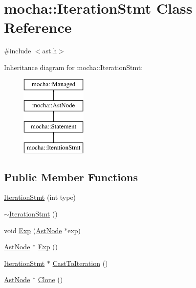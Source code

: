 \hypertarget{classmocha_1_1_iteration_stmt}{
\section{mocha::IterationStmt Class Reference}
\label{classmocha_1_1_iteration_stmt}
}


{\ttfamily \#include $<$ast.h$>$}

Inheritance diagram for mocha::IterationStmt:\begin{figure}[H]
\begin{center}
\leavevmode
\includegraphics[height=4.000000cm]{classmocha_1_1_iteration_stmt}
\end{center}
\end{figure}
\subsection*{Public Member Functions}
\begin{DoxyCompactItemize}
\item 
\hyperlink{classmocha_1_1_iteration_stmt_a038c19a5378eeb918acbfa9cd46f7ba6}{IterationStmt} (int type)
\item 
\hyperlink{classmocha_1_1_iteration_stmt_ac0a43232d7647e06adc37ccc226da1e7}{$\sim$IterationStmt} ()
\item 
void \hyperlink{classmocha_1_1_iteration_stmt_ae35c5585d41cc876d4236a534aac16ed}{Exp} (\hyperlink{classmocha_1_1_ast_node}{AstNode} $\ast$exp)
\item 
\hyperlink{classmocha_1_1_ast_node}{AstNode} $\ast$ \hyperlink{classmocha_1_1_iteration_stmt_a9525f841a3cf7f6b49fb33ee24a6ea32}{Exp} ()
\item 
\hyperlink{classmocha_1_1_iteration_stmt}{IterationStmt} $\ast$ \hyperlink{classmocha_1_1_iteration_stmt_ac9a778b002e50fb49212164307423ecb}{CastToIteration} ()
\item 
\hyperlink{classmocha_1_1_ast_node}{AstNode} $\ast$ \hyperlink{classmocha_1_1_iteration_stmt_ac2dcc191031a045a43892d4ceb284c16}{Clone} ()
\end{DoxyCompactItemize}
